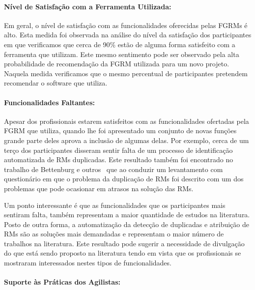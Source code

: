 \paragraph{Nível de Satisfação com a Ferramenta Utilizada:}
\label{par:pesq_profissionais_nivel_de_satisfação}

Em geral, o nível de satisfação com as funcionalidades oferecidas pelas FGRMs é
alto. Esta medida foi observada na análise do nível da satisfação dos
participantes em que verificamos que cerca de 90\% estão de alguma forma
satisfeito com a ferramenta que utilizam. Este mesmo sentimento pode ser
observado pela alta probabilidade de recomendação da FGRM utilizada para um novo
projeto. Naquela medida verificamos que o mesmo percentual de participantes
pretendem recomendar o software que utiliza.

\paragraph{Funcionalidades Faltantes:}
\label{par:pesq_profissionais_funcionalidades_faltantes}

Apesar dos profissionais estarem satisfeitos com as funcionalidades ofertadas
pela FGRM que utiliza, quando lhe foi apresentado um conjunto de novas funções
grande parte deles aprova a inclusão de algumas delas. Por exemplo, cerca de um
terço dos participantes disseram sentir falta de um processo de identificação
automatizada de RMs duplicadas. Este resultado também foi encontrado no trabalho
de Bettenburg e outros~\cite{bettenburg2008makes} que ao conduzir um
levantamento com questionário em que o problema da duplicação de RMs foi descrito
com um dos problemas que pode ocasionar em atrasos na solução das RMs.

Um ponto interessante é que as funcionalidades que os participantes mais
sentiram falta, também representam a maior quantidade de estudos na literatura.
Posto de outra forma, a automatização da detecção de duplicadas e atribuição de
RMs são as soluções mais demandadas e representam o maior número de trabalhos na
literatura. Este resultado pode sugerir a necessidade de divulgação do que está
sendo proposto na literatura tendo em vista que os profissionais se mostraram
interessados nestes tipos de funcionalidades.

\paragraph{Suporte às Práticas dos Agilistas:}
\label{par:pesq_profissionais_suporte_pratica_agilistas}


